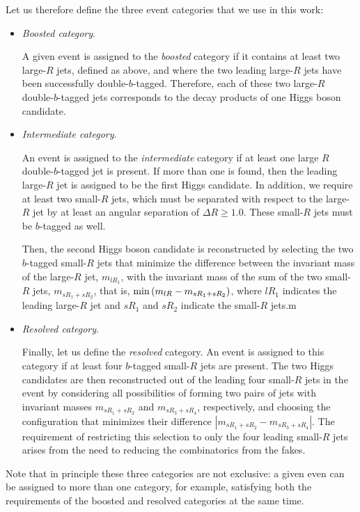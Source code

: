 Let us therefore define the three event categories that
we use in this work:
\begin{itemize}
\item {\it Boosted category}.

  A given event is assigned to the {\it boosted} category if it
  contains at least two large-$R$ jets, defined as above,
  and where  the two leading large-$R$ jets have been
  successfully double-$b$-tagged.
 Therefore, each of these two large-$R$ double-$b$-tagged jets corresponds to the
 decay products of one Higgs boson candidate.

\item {\it Intermediate category}.

  An event is assigned to the {\it intermediate} category if
  at least one large $R$ double-$b$-tagged jet is present.
  If more than one is found, then the leading large-$R$ jet
  is assigned to be the first Higgs candidate.
  In addition, we require at least two small-$R$ jets,
  which must be separated with respect to the large-$R$
  jet by at least an angular separation of $\Delta R\ge 1.0$.
  These small-$R$ jets must be $b$-tagged as well.

  
  Then, the second Higgs boson candidate is reconstructed
  by selecting the two $b$-tagged small-$R$ jets that minimize the difference
  between the invariant mass of the large-$R$ jet, $m_{lR_1}$,
  with the invariant mass of the sum of the two small-$R$ jets,
  $m_{sR_1+sR_2}$, that is, ${\rm min}\left( m_{lR} -
  m_{sR_1+sR_2}\right)$, where $lR_1$ indicates the leading large-$R$ jet
  and $sR_1$ and $sR_2$ indicate the small-$R$ jets.m

\item {\it Resolved category}.

  Finally, let us define the {\it resolved} category.
  An event is assigned to this category
  if at least
  four $b$-tagged small-$R$ jets are present.
  The two Higgs candidates are then reconstructed out of the
  leading four small-$R$ jets in the event
  by considering all possibilities of forming two pairs of jets
  with invariant masses $m_{sR_1+sR_2}$ and 
$m_{sR_3+sR_4}$, respectively, and choosing the configuration that minimizes their difference $|m_{sR_1+sR_2} - m_{sR_3+sR_4}|$. 
  The requirement of restricting this selection to only the four
  leading small-$R$ jets arises from the need to reducing the
  combinatorics from the fakes.
\end{itemize}
Note that in principle these three categories are not exclusive:
a given even can be assigned to more than one category, for
example, satisfying both the requirements of the boosted and resolved
categories at the same time.



